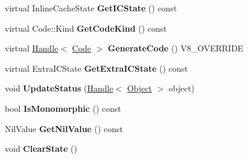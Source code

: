 \begin{DoxyCompactItemize}
\item 
\hypertarget{classv8_1_1internal_1_1_compare_nil_i_c_stub_a122fc37f091e53494ef7ba7b8e274e63}{}virtual Inline\+Cache\+State {\bfseries Get\+I\+C\+State} () const \label{classv8_1_1internal_1_1_compare_nil_i_c_stub_a122fc37f091e53494ef7ba7b8e274e63}

\item 
\hypertarget{classv8_1_1internal_1_1_compare_nil_i_c_stub_ae87a01f45511bacf1432e4b621041369}{}virtual Code\+::\+Kind {\bfseries Get\+Code\+Kind} () const \label{classv8_1_1internal_1_1_compare_nil_i_c_stub_ae87a01f45511bacf1432e4b621041369}

\item 
\hypertarget{classv8_1_1internal_1_1_compare_nil_i_c_stub_a668011d51050ffd53f5154a46773c630}{}virtual \hyperlink{classv8_1_1internal_1_1_handle}{Handle}$<$ \hyperlink{classv8_1_1internal_1_1_code}{Code} $>$ {\bfseries Generate\+Code} () V8\+\_\+\+O\+V\+E\+R\+R\+I\+D\+E\label{classv8_1_1internal_1_1_compare_nil_i_c_stub_a668011d51050ffd53f5154a46773c630}

\item 
\hypertarget{classv8_1_1internal_1_1_compare_nil_i_c_stub_a3128ef0d61d9802a21124183ddfc49b1}{}virtual Extra\+I\+C\+State {\bfseries Get\+Extra\+I\+C\+State} () const \label{classv8_1_1internal_1_1_compare_nil_i_c_stub_a3128ef0d61d9802a21124183ddfc49b1}

\item 
\hypertarget{classv8_1_1internal_1_1_compare_nil_i_c_stub_a25e814e1eb95f8d2aa9ab376fddf84cc}{}void {\bfseries Update\+Status} (\hyperlink{classv8_1_1internal_1_1_handle}{Handle}$<$ \hyperlink{classv8_1_1internal_1_1_object}{Object} $>$ object)\label{classv8_1_1internal_1_1_compare_nil_i_c_stub_a25e814e1eb95f8d2aa9ab376fddf84cc}

\item 
\hypertarget{classv8_1_1internal_1_1_compare_nil_i_c_stub_a2d371e815838b60009f3afedf3d0fe9f}{}bool {\bfseries Is\+Monomorphic} () const \label{classv8_1_1internal_1_1_compare_nil_i_c_stub_a2d371e815838b60009f3afedf3d0fe9f}

\item 
\hypertarget{classv8_1_1internal_1_1_compare_nil_i_c_stub_aa4fe9855ad7106855b8cb6634b2cbcbf}{}Nil\+Value {\bfseries Get\+Nil\+Value} () const \label{classv8_1_1internal_1_1_compare_nil_i_c_stub_aa4fe9855ad7106855b8cb6634b2cbcbf}

\item 
\hypertarget{classv8_1_1internal_1_1_compare_nil_i_c_stub_af2ecbdf4f7c90fc99af615af50e64ff9}{}void {\bfseries Clear\+State} ()\label{classv8_1_1internal_1_1_compare_nil_i_c_stub_af2ecbdf4f7c90fc99af615af50e64ff9}


\end{DoxyCompactItemize}
